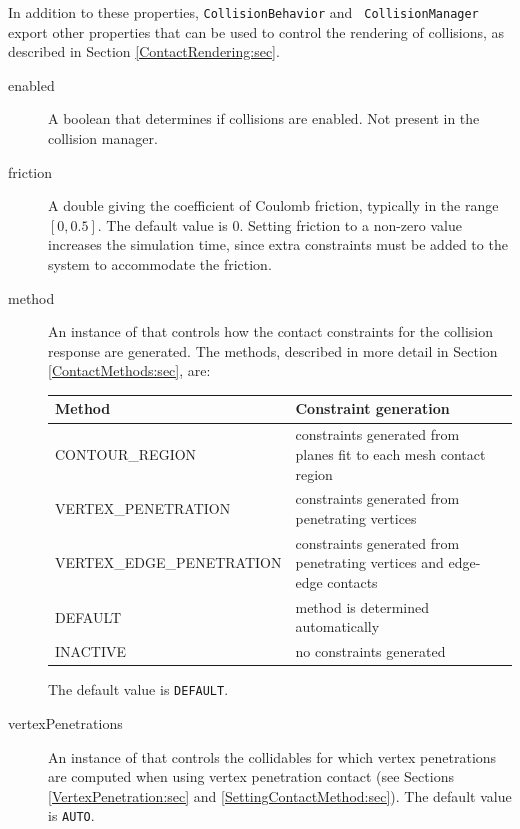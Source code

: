 \begin{sideblock}
In addition to these properties, {\tt CollisionBehavior} and {\tt
CollisionManager} export other properties that can be used to control
the rendering of collisions, as described in
Section \ref{ContactRendering:sec}.
\end{sideblock}

\begin{description}

\item[enabled]\mbox{}

A boolean that determines if collisions are enabled. Not present
in the collision manager.

\item[friction]\mbox{}

A double giving the coefficient of Coulomb friction, typically in the
range $[0,0.5]$. The default value is 0. Setting friction to a
non-zero value increases the simulation time, since extra constraints
must be added to the system to accommodate the friction. 

\item[method]\mbox{}

An instance of
 that
controls how the contact constraints for the collision response are
generated. The methods, described in more detail in Section
\ref{ContactMethods:sec}, are:

\begin{tabular}{lll}
\hline
Method & Constraint generation \\
\hline
CONTOUR\_REGION & 
constraints generated from planes fit to each mesh contact region \\
VERTEX\_PENETRATION & constraints generated from penetrating vertices\\
VERTEX\_EDGE\_PENETRATION & 
constraints generated from penetrating vertices and edge-edge contacts\\
DEFAULT & method is determined automatically\\
INACTIVE & no constraints generated\\
\hline
\end{tabular}

The default value is {\tt DEFAULT}.

\item[vertexPenetrations]\mbox{}

An instance of
that controls the collidables for which vertex penetrations are
computed when using vertex penetration contact (see Sections
\ref{VertexPenetration:sec} and \ref{SettingContactMethod:sec}).
The default value is {\tt AUTO}.


\end{description}
